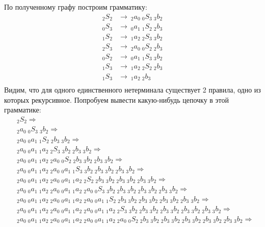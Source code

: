 \begin{example}
	По полученному графу построим грамматику:
	\begin{align*}
	_2S_2   &\to\ _2a_0\ _0S_3\ _3b_2 \\ 
	_0S_3   &\to\ _0a_1\ _1S_2\ _2b_3 \\
	_1S_2   &\to\ _1a_2\ _2S_3\ _3b_2 \\ 
	_2S_3   &\to\ _2a_0\ _0S_2\ _2b_3 \\ 
	_0S_2   &\to\ _0a_1\ _1S_3\ _3b_2 \\ 
	_1S_3   &\to\ _1a_2\ _2S_2\ _2b_3 \\ 
	_1S_3   &\to\ _1a_2\ _2b_3 \\ 
	\end{align*}
	Видим, что для одного единственного нетерминала существует 2 правила, одно из которых рекурсивное. Попробуем вывести какую-нибудь цепочку в этой грамматике: 
    \begin{align*}
        & _2S_2 \Rightarrow \\
    	& {_2a_0}\ {_0S_3}\ {_3b_2} \Rightarrow \\
    	& {_2a_0}\ {_0a_1}\ {_1S_2}\ {_2b_3}\ {_3b_2} \Rightarrow \\
    	& {_2a_0}\ {_0a_1}\ {_1a_2}\ {_2S_3}\ {_3b_2}\ {_2b_3}\ {_3b_2} \Rightarrow \\
    	& {_2a_0}\ {_0a_1}\ {_1a_2}\ {_2a_0}\ {_0S_2}\ {_2b_3}\ {_3b_2}\ {_2b_3}\ {_3b_2} \Rightarrow \\
    	& {_2a_0}\ {_0a_1}\ {_1a_2}\ {_2a_0}\ {_0a_1}\ {_1S_3}\ {_3b_2}\ {_2b_3}\ {_3b_2}\ {_2b_3}\ {_3b_2} \Rightarrow \\
    	& {_2a_0}\ {_0a_1}\ {_1a_2}\ {_2a_0}\ {_0a_1}\ {_1a_2}\ {_2S_2}\ {_2b_3}\ {_3b_2}\ {_2b_3}\ {_3b_2}\ {_2b_3}\ {_3b_2} \Rightarrow \\
    	& {_2a_0}\ {_0a_1}\ {_1a_2}\ {_2a_0}\ {_0a_1}\ {_1a_2}\ {_2a_0}\ {_0S_3}\ {_3b_2}\ {_2b_3}\ {_3b_2}\ {_2b_3}\ {_3b_2}\ {_2b_3}\ {_3b_2} \Rightarrow \\
    	& {_2a_0}\ {_0a_1}\ {_1a_2}\ {_2a_0}\ {_0a_1}\ {_1a_2}\ {_2a_0}\ {_0a_1}\ {_1S_2}\ {_2b_3}\ {_3b_2}\ {_2b_3}\ {_3b_2}\ {_2b_3}\ {_3b_2}\ {_2b_3}\ {_3b_2} \Rightarrow \\
    	& {_2a_0}\ {_0a_1}\ {_1a_2}\ {_2a_0}\ {_0a_1}\ {_1a_2}\ {_2a_0}\ {_0a_1}\ {_1a_2}\ {_2S_3}\ {_3b_2}\ {_2b_3}\ {_3b_2}\ {_2b_3}\ {_3b_2}\ {_2b_3}\ {_3b_2}\ {_2b_3}\ {_3b_2} \Rightarrow \\
    	& {_2a_0}\ {_0a_1}\ {_1a_2}\ {_2a_0}\ {_0a_1}\ {_1a_2}\ {_2a_0}\ {_0a_1}\ {_1a_2}\ {_2a_0}\ {_0S_2}\ {_2b_3}\ {_3b_2}\ {_2b_3}\ {_3b_2}\ {_2b_3}\ {_3b_2}\ {_2b_3}\ {_3b_2}\ {_2b_3}\ {_3b_2} \Rightarrow \\

\end{align*}
\end{example}
